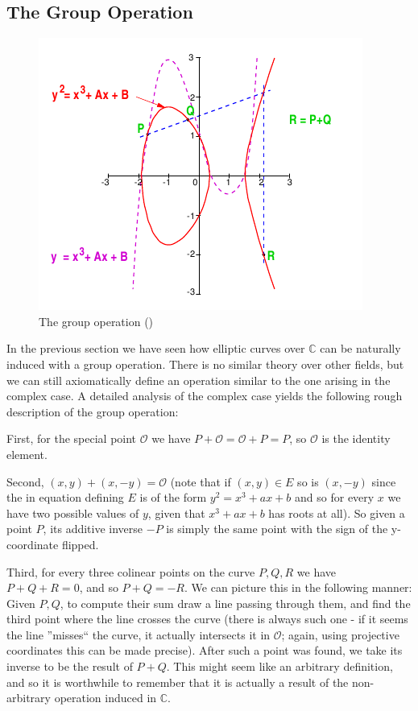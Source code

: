 \documentclass[11pt,english]{article}
\begin{document}
\subsection{The Group Operation}
\begin{figure}
   \centering
   \includegraphics[scale = 0.5]{ecaddition.png}
   \caption{The group operation (\cite{maurerscript})}
\end{figure}
In the previous section we have seen how elliptic curves over $\mathbb{C}$ can be naturally induced with a group operation. There is no similar theory over
other fields, but we can still axiomatically define an operation similar to the one arising in the complex case. A detailed analysis of the complex case yields
the following rough description of the group operation:

First, for the special point $\mathcal{O}$ we have $P+\mathcal{O}=\mathcal{O}+P=P$, so $\mathcal{O}$ is the identity element.

Second, $(x,y)+(x,-y)=\mathcal{O}$ (note that if $(x,y)\in E$ so is $(x,-y)$ since the in equation defining $E$ is of the form $y^2=x^3+ax+b$ and so for
every $x$ we have two possible values of $y$, given that $x^3+ax+b$ has roots at all). So given a point $P$, its additive inverse $-P$ is simply the same point
with the sign of the y-coordinate flipped.

Third, for every three colinear points on the curve $P,Q,R$ we have $P+Q+R=0$, and so $P+Q=-R$. We can picture this in the following manner: Given $P,Q$,
to compute their sum draw a line passing through them, and find the third point where the line crosses the curve (there is always such one - if it seems the line 
''misses`` the curve, it actually intersects it in $\mathcal{O}$; again, using projective coordinates this can be made precise). After such a point was found, we
take its inverse to be the result of $P+Q$. This might seem like an arbitrary definition, and so it is worthwhile to remember that it is actually a result of the non-arbitrary
operation induced in $\mathbb{C}$.
\end{document}
